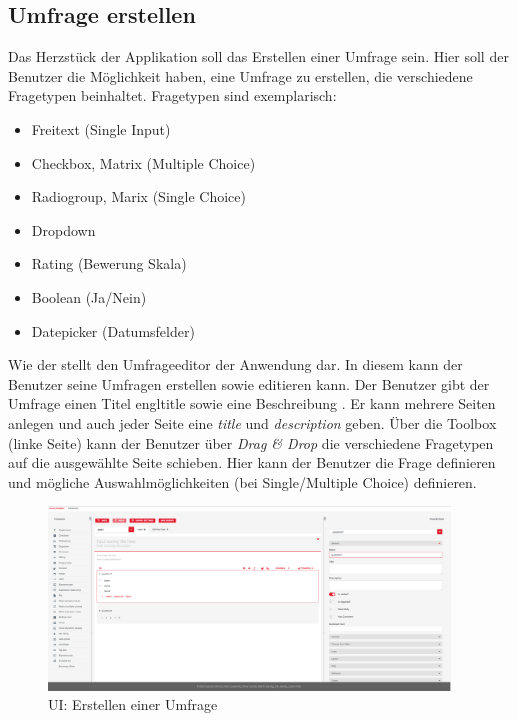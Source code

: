 
\subsection{Umfrage erstellen}
\label{ssec:UmfrageErstellen}

Das Herzstück der Applikation soll das Erstellen einer Umfrage sein. 
Hier soll der Benutzer die Möglichkeit haben, eine Umfrage zu erstellen, die verschiedene Fragetypen beinhaltet. 
Fragetypen sind exemplarisch: 
%
\begin{itemize}
	\item Freitext (Single Input)
	\item Checkbox, Matrix (Multiple Choice)
	\item Radiogroup, Marix (Single Choice)
	\item Dropdown 
	\item Rating (Bewerung Skala)
	\item Boolean (Ja/Nein)
	\item Datepicker (Datumsfelder)
\end{itemize}
%

Wie der \abb {} stellt den Umfrageeditor der Anwendung dar. In diesem kann der Benutzer seine Umfragen erstellen sowie editieren kann. 
Der Benutzer gibt der Umfrage einen Titel engl{title} sowie eine Beschreibung . 
Er kann mehrere Seiten anlegen und auch jeder Seite eine \emph{title} und \emph{description} geben. \newline
Über die Toolbox (linke Seite) kann der Benutzer über \emph{Drag \& Drop} die verschiedene Fragetypen auf die ausgewählte Seite schieben.  
Hier kann der Benutzer die Frage definieren und mögliche Auswahlmöglichkeiten (bei Single/Multiple Choice) definieren. 

\begin{figure}[!htb]
	\centering
	\includegraphics[width=0.95\textwidth, keepaspectratio]{img/client/CreateSurveyMaster.png}
	\captionsetup{justification=centering, format=plain}
	\caption[\acf{UI}: Erstellen einer Umfrage]{\acf{UI}: Erstellen einer Umfrage \\ \quelleScreenshot}
	\label{fig:SurveyCreatorImplement}
\end{figure}

